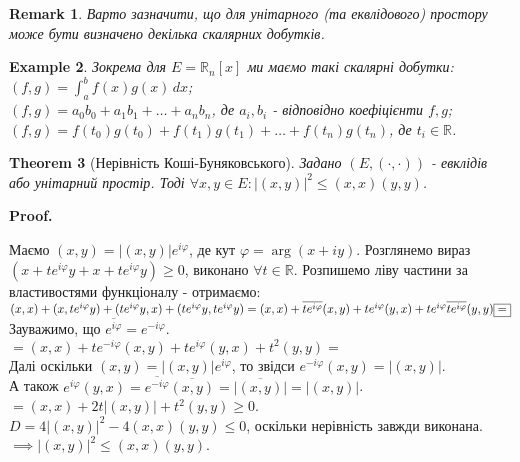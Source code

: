 \documentclass[a4paper, 10pt]{article}
\makeatletter
\theoremstyle{theoremdd}
\newtheorem{theorem}{Theorem}[subsection]
\newtheorem{example}[theorem]{Example}
\newtheorem{remark}[theorem]{Remark}
\renewenvironment{proof}[1][Proof.\\]{\par
\pushQED{\hfill \qed}%
\normalfont \topsep6\p@\@plus6\p@\relax
\trivlist
\item\relax
{\bfseries
#1\@addpunct{.}}\hspace\labelsep\ignorespaces
}{%
\popQED\endtrivlist\@endpefalse
}
\makeatother
\begin{document}
\begin{remark}
Варто зазначити, що для унітарного (та еквлідового) простору може бути визначено декілька скалярних добутків.
\end{remark}

\begin{example}
Зокрема для $E = \mathbb{R}_n[x]$ ми маємо такі скалярні добутки:\\
$(f,g) = \displaystyle\int_a^b f(x)g(x)\,dx$;\\
$(f,g) = a_0 b_0 + a_1 b_1 + \dots + a_n b_n$, де $a_i,b_i$ - відповідно коефіцієнти $f,g$;\\
$(f,g) = f(t_0)g(t_0) + f(t_1)g(t_1) + \dots + f(t_n)g(t_n)$, де $t_i \in \mathbb{R}$.
\end{example}

\begin{theorem}[Нерівність Коші-Буняковського]
Задано $(E, (\cdot , \cdot))$ - евклідів або унітарний простір. Тоді $\forall x,y \in E: |(x,y)|^2 \leq (x,x)(y,y)$.
\end{theorem}

\begin{proof}
\iffalse
I. \textit{Випадок евклідового простору.}\\
Розглянемо вираз $(x+ty, x+ty) \geq 0$, виконано $\forall t \in \mathbb{R}$. Розпишемо ліву частини за властивостями функціоналу - отримаємо:\\
$(x,x) + t(x,y) + t(y,x) + t^2(y,y) = t^2(y,y) + 2t(x,y) + (x,x) \geq 0$\\
$D = 4(x,y)^2 - 4(x,x)(y,y) \leq 0$, оскільки нерівність завжди виконана $\implies (x,y)^2 \leq (x,x)(y,y)$.
\bigskip \\
II. \textit{Випадок унітарного простору.}\\
\fi
Маємо $(x,y) = |(x,y)|e^{i \varphi}$, де кут $\varphi = \arg (x+iy)$. Розглянемо вираз $(x+te^{i\varphi}y + x + t e^{i\varphi}y) \geq 0$, виконано $\forall t \in \mathbb{R}$. Розпишемо ліву частини за властивостями функціоналу - отримаємо:\\
$(x,x)+(x,te^{i\varphi}y) + (te^{i\varphi}y,x)+(te^{i\varphi}y, te^{i\varphi}y)
= (x,x) + \overline{t e^{i\varphi}}(x,y) + te^{i \varphi} (y,x) + te^{i \varphi} \overline{t e^{i\varphi}} (y,y) \boxed{=} \\ $
Зауважимо, що $\overline{e^{i\varphi}} = e^{-i\varphi}$.\\
$\boxed{=} (x,x) + te^{-i\varphi}(x,y) + te^{i\varphi}(y,x) + t^2(y,y) \boxed{=}$\\
Далі оскільки $(x,y) = |(x,y)|e^{i \varphi}$, то звідси $e^{-i \varphi}(x,y) = |(x,y)|$.\\
А також $e^{i\varphi}(y,x) = \overline{e^{-i\varphi}} \overline{(x,y)} = \overline{|(x,y)|} = |(x,y)|$.\\
$\boxed{=} (x,x) + 2t|(x,y)| + t^2(y,y) \geq 0$.\\
$D = 4|(x,y)|^2 - 4(x,x)(y,y) \leq 0$, оскільки нерівність завжди виконана.\\
$\implies |(x,y)|^2 \leq (x,x)(y,y)$.
\end{proof}
\end{document}
